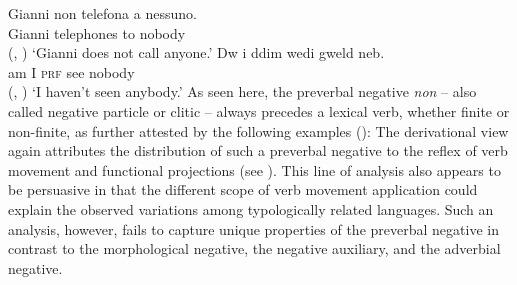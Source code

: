 \documentclass[output=paper
 	        ,biblatex
                ,babelshorthands
                ,newtxmath
                ,draftmode
                ,colorlinks, citecolor=brown
]{langscibook}
\begin{document}
\begin{exe}
\begin{xlist}
\begin{exe}
\begin{xlist}
\eal
\ex \label{negation-position-1a}
\gll Gianni non telefona a nessuno.\\
     Gianni \NEG{} telephones to nobody\\ \hfill (, \citealt[]{Borsley:06})
\glt`Gianni does not call anyone.'
\ex \label{negation-position-1c}
\gll Dw i ddim wedi gweld neb.\\
     am I \NEG{} \textsc{prf} see nobody\\ \hfill  (, \citealt[]{Borsley:05})
\glt `I haven't seen anybody.'
\zl
%
%
As seen here,
the  preverbal negative \textit{non} -- also called negative particle or
clitic -- always precedes a lexical  verb, whether finite or
non-finite, as further attested by the following
examples (\citealp[Chapter~4]{Kim:00}):
%
\eal
{}
%
%
\zl
%
%
The derivational view again attributes the distribution of such a preverbal negative to the reflex
of verb movement and functional projections (see \citealt[Chapter~1]{Belletti:90}). This line of
analysis also appears to be persuasive in that the different scope of verb movement application
could explain the observed variations among typologically related languages. Such an analysis,
however, fails to capture unique properties of the preverbal negative in contrast to the
morphological negative, the negative auxiliary, and the adverbial negative.


\end{xlist}
\end{exe}
\end{xlist}
\end{exe}
\end{document}

